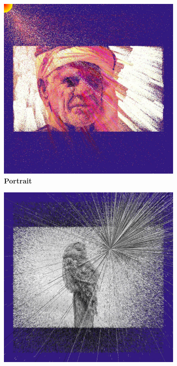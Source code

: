 \documentclass[../mciAusarbeitung.tex]{subfiles}
\begin{document}
	\begin{figure}[H]
		\begin{subfigure}{0.5\linewidth}
 		\includegraphics[width=0.95\linewidth]{"img/3dimageevolution_potrait.jpg"}
		\caption[Portrait]{\textbf{Portrait}}  
		 \end{subfigure}
		\begin{subfigure}{0.5\linewidth}
 		\includegraphics[width=0.95\linewidth]{"img/3dimageevolution_owl.jpg"}

\end{subfigure}
\end{figure}
\end{document}

